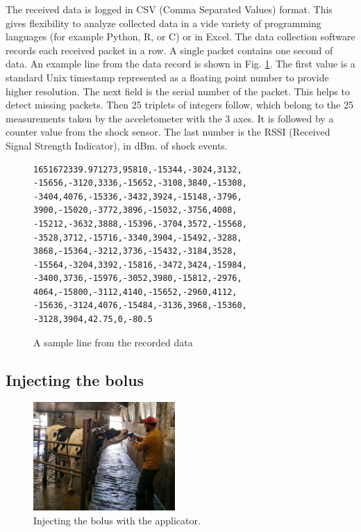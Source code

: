 \documentclass[conference]{IEEEtran}
\begin{document}
The received data is logged in CSV (Comma Separated Values) format. This gives
flexibility to analyze collected data in a vide variety of programming languages
(for example Python, R, or C) or in Excel. The data collection software records
each received packet in a row. A single packet contains one second of data.
An example line from the data record is shown in Fig. \ref{csv-sample}. The first
value is a standard Unix timestamp represented as a floating point number to provide
higher resolution. The next field is the serial number of the packet. This helps to
detect missing packets. Then 25 triplets of integers follow, which belong to the
25 measurements taken by the acceletometer with the 3 axes. It is followed by
a counter value from the shock sensor. The last number is the RSSI (Received
Signal Strength Indicator), in dBm.
of shock events.

\begin{figure}[htbp]
\begin{verbatim}
1651672339.971273,95810,-15344,-3024,3132,
-15656,-3120,3336,-15652,-3108,3840,-15308,
-3404,4076,-15336,-3432,3924,-15148,-3796,
3900,-15020,-3772,3896,-15032,-3756,4008,
-15212,-3632,3888,-15396,-3704,3572,-15568,
-3528,3712,-15716,-3340,3904,-15492,-3288,
3868,-15364,-3212,3736,-15432,-3184,3528,
-15564,-3204,3392,-15816,-3472,3424,-15984,
-3400,3736,-15976,-3052,3980,-15812,-2976,
4064,-15800,-3112,4140,-15652,-2960,4112,
-15636,-3124,4076,-15484,-3136,3968,-15360,
-3128,3904,42.75,0,-80.5
\end{verbatim}
  \caption{A sample line from the recorded data}
\label{csv-sample}
\end{figure}


\subsection{Injecting the bolus}

\begin{figure}[htbp]
\centerline{\includegraphics[width=0.48\textwidth]{fig/bolus_application.jpg}}
  \caption{Injecting the bolus with the applicator.}
\label{bolus-gw-photo}
\end{figure}
\end{document}
